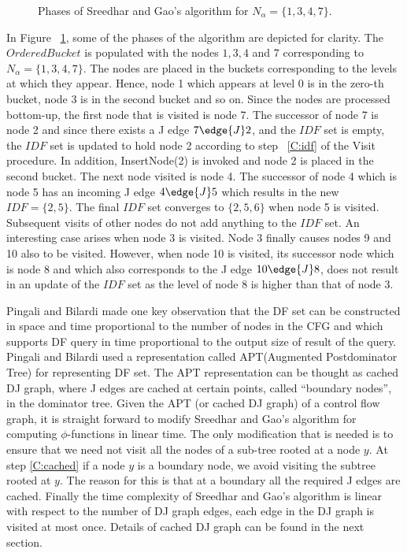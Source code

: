     \begin{figure}[htb]
    \caption{Phases of Sreedhar and Gao's algorithm for $N_\alpha=\{1,3,4,7\}$.}
    \label{fig:sreedhargao}
    \end{figure} 

In Figure ~\ref{fig:sreedhargao}, some of the phases of the algorithm are depicted for clarity. The $OrderedBucket$
is populated with the nodes $1,3,4$ and $7$ corresponding to $N_\alpha=\{1,3,4,7\}$. The nodes are
placed in the buckets corresponding to the levels at which they appear. Hence, node 1 which appears at 
level 0 is in the zero-th bucket, node 3 is in the second bucket and so on. Since the
nodes are processed bottom-up, the first node that is visited is node 7. The successor of node 7 is node
2 and since there exists a J edge $7 \edge{J} 2$, and the $IDF$ set is empty, the $IDF$ set is updated
to hold node 2 according to step ~\ref{C:idf} of the Visit procedure. In addition, InsertNode(2) is invoked and 
node 2 is placed in the second bucket. The next node visited is node 4. The successor of node 4 which is node
5 has an incoming J edge $4 \edge{J} 5$ which results in the new $IDF = \{2,5\}$. The final $IDF$ set converges
to $\{2,5,6\}$ when node 5 is visited. Subsequent visits of other nodes do not add anything to the
$IDF$ set. An interesting case arises when node 3 is visited. Node 3 finally causes nodes 9 and 10 also 
to be visited. However, when node 10 is visited, its successor node which is node 8 and which also 
corresponds to the J edge $10 \edge{J} 8$, does not result in an update of the $IDF$ set as the level of
node 8 is higher than that of node 3.

Pingali and Bilardi made one key observation that the DF set 
can be constructed in space and 
time proportional to the number of nodes in the CFG and which supports DF query 
in time proportional to the output size of result of the query.  Pingali and Bilardi used
a representation called APT(Augmented Postdominator Tree) for representing DF set. 
The APT representation can be
thought as cached DJ graph, where J edges are cached at certain points, called 
``boundary nodes'', in the dominator tree. Given the APT 
(or cached DJ graph) of a control flow graph, it is straight forward to 
modify  Sreedhar and Gao's algorithm for computing $\phi$-functions in linear time. 
 The only modification that is needed is to
ensure that we need not visit all the nodes of a sub-tree rooted at a node
$y$. At step \ref{C:cached} if a node $y$ is a boundary node, we avoid visiting 
the subtree rooted at $y$. The reason for this is that at a boundary all the
required J edges are cached. 
Finally the time complexity of Sreedhar and Gao's algorithm is linear with respect to the number
of DJ graph edges, each edge in the DJ graph is visited at most
once. Details of cached DJ graph can be found in the next section.



